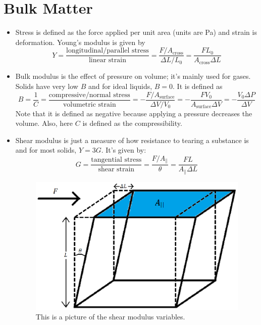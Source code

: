 \documentclass{scrartcl}
\begin{document}
    \section{Bulk Matter}
    \begin{itemize}
        \item Stress is defined as the force applied per unit area (units are Pa) and strain is deformation. Young's modulus is given by \[Y=\frac{\text{longitudinal/parallel stress}}{\text{linear strain}}=\frac{F/A_\text{cross}}{\Delta L/L_0}=\frac{FL_0}{A_\text{cross}\Delta L}\]
        \item Bulk modulus is the effect of pressure on volume; it's mainly used for gases. Solids have  very low $B$ and for ideal liquids, $B=0$. It is defined as \[B=\frac1C=\frac{\text{compressive/normal stress}}{\text{volumetric strain}}=-\frac{F/A_\text{surface}}{\Delta V/V_0}=-\frac{FV_0}{A_\text{surface}\Delta V}=-\frac{V_0\Delta P}{\Delta V}\] Note that it is defined as negative because applying a pressure decreases the volume. Also, here $C$ is defined as the compressibility.
        \item Shear modulus is just a measure of how resistance to tearing a substance is and for most solids, $Y=3G$. It's given by: \[G=\frac{\text{tangential stress}}{\text{shear strain}}=\frac{F/A_\parallel}{\theta}=\frac{FL}{A_\parallel\Delta L}\]
        \begin{figure}[H]
            \centering
            \begin{minipage}[b]{0.667\textwidth}
                \includegraphics[width=\textwidth]{shear.eps}
                \caption{This is a picture of the shear modulus variables.}
            \end{minipage}
        \end{figure}

\end{itemize}
\end{document}
